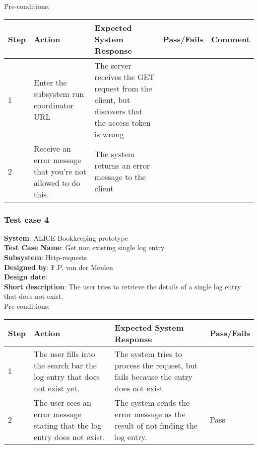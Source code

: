 Pre-conditions: \\

\begin{longtable}{ | p{1cm} | p{3cm} | p{6cm} | p{1.5cm} | p{1.5cm} |}
\hline
Step & Action & Expected System Response & Pass/Fails & Comment \\ \hline
1 & Enter the subsystem run coordinator URL & The server receives the GET request from the client, but discovers that the access token is wrong & & \\ \hline
2 & Receive an error message that you're not allowed to do this. & The system returns an error message to the client & & \\ \hline 
\end{longtable}

\subsubsection{Test case 4}
\textbf{System}:  ALICE Bookkeeping prototype \\
\textbf{Test Case Name}:  Get non existing single log entry \\
\textbf{Subsystem}:  Http-requests \\
\textbf{Designed by}:  F.P. van der Meulen\\
\textbf{Design date}:  \\
\textbf{Short description}: The user tries to retrieve the details of a single log entry that does not exist. \\

Pre-conditions: \\

\begin{longtable}{ | p{0.8cm} | p{4.5cm} | p{6cm} | p{1.5cm} |}
\hline
Step & Action & Expected System Response & Pass/Fails  \\ \hline
1 & The user fills into the search bar the log entry that does not exist yet. & The system tries to process the request, but fails because the entry does not exist &   \\ \hline
2 & The user sees an error message stating that the log entry does not exist. & The system sends the error message as the result of not finding the log entry. & Pass \\ \hline

\end{longtable}

